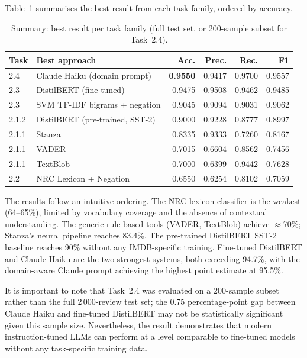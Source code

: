 \documentclass[12pt,reqno,twoside]{amsbook}
\theoremstyle{plain}
\numberwithin{equation}{chapter}
\numberwithin{section}{chapter}
\begin{document}
\noindent Table~\ref{tab:summary} summarises the best result from each task
family, ordered by accuracy.

\begin{table}[ht]
\centering
\caption{Summary: best result per task family (full test set, or 200-sample
subset for Task~2.4).}
\label{tab:summary}
\begin{tabular}{llrrrr}
\toprule
Task & Best approach & Acc. & Prec. & Rec. & F1 \\
\midrule
2.4   & Claude Haiku (domain prompt)     & \textbf{0.9550} & 0.9417 & 0.9700 & 0.9557 \\
2.3   & DistilBERT (fine-tuned)          & 0.9475          & 0.9508 & 0.9462 & 0.9485 \\
2.3   & SVM TF-IDF bigrams + negation    & 0.9045          & 0.9094 & 0.9031 & 0.9062 \\
2.1.2 & DistilBERT (pre-trained, SST-2)  & 0.9000          & 0.9228 & 0.8777 & 0.8997 \\
2.1.1 & Stanza                           & 0.8335          & 0.9333 & 0.7260 & 0.8167 \\
2.1.1 & VADER                            & 0.7015          & 0.6604 & 0.8562 & 0.7456 \\
2.1.1 & TextBlob                         & 0.7000          & 0.6399 & 0.9442 & 0.7628 \\
2.2   & NRC Lexicon + Negation           & 0.6550          & 0.6254 & 0.8102 & 0.7059 \\
\bottomrule
\end{tabular}
\end{table}

\noindent The results follow an intuitive ordering.
The NRC lexicon classifier is the weakest (64--65\%), limited by vocabulary
coverage and the absence of contextual understanding.
The generic rule-based tools (VADER, TextBlob) achieve $\approx$70\%; Stanza's
neural pipeline reaches 83.4\%.
The pre-trained DistilBERT SST-2 baseline reaches 90\% without any IMDB-specific
training.
Fine-tuned DistilBERT and Claude Haiku are the two strongest systems, both
exceeding 94.7\%, with the domain-aware Claude prompt achieving the highest
point estimate at 95.5\%.

It is important to note that Task~2.4 was evaluated on a 200-sample subset rather
than the full 2\,000-review test set; the 0.75 percentage-point gap between Claude
Haiku and fine-tuned DistilBERT may not be statistically significant given this
sample size.
Nevertheless, the result demonstrates that modern instruction-tuned LLMs can
perform at a level comparable to fine-tuned models without any task-specific
training data.
\end{document}
